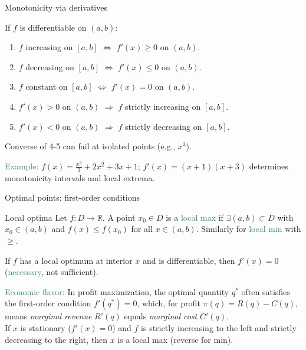 \documentclass[11pt,aspectratio=169]{beamer}
\begin{document}
\begin{frame}{Monotonicity via derivatives}

If $f$ is differentiable on $(a,b)$:
\begin{enumerate}
\item $f$ increasing on $[a,b]$ $\Longleftrightarrow$ $f'(x)\ge 0$ on $(a,b)$.
\item $f$ decreasing on $[a,b]$ $\Longleftrightarrow$ $f'(x)\le 0$ on $(a,b)$.
\item $f$ constant on $[a,b]$ $\Longleftrightarrow$ $f'(x)=0$ on $(a,b)$.
\item $f'(x)>0$ on $(a,b)$ $\Rightarrow$ $f$ strictly increasing on $[a,b]$.
\item $f'(x)<0$ on $(a,b)$ $\Rightarrow$ $f$ strictly decreasing on $[a,b]$.
\end{enumerate}
\begin{tiny}Converse of 4-5 can fail at isolated points (e.g., $x^3$).\end{tiny}
\bigskip

\textcolor{SeaGreen}{Example:} $f(x)=\frac{x^3}{3}+2x^2+3x+1$; $f'(x)=(x+1)(x+3)$ determines monotonicity intervals and local extrema.
\end{frame}

\begin{frame}{Optimal points: first-order conditions}
\begin{block}{Local optima}
Let $f:D\to\mathbb{R}$. A point $x_0\in D$ is a \textcolor{SeaGreen}{local max} if $\exists (a,b)\subset D$ with $x_0\in(a,b)$ and $f(x)\le f(x_0)$ for all $x\in(a,b)$.
Similarly for \textcolor{SeaGreen}{local min} with $\ge$.\\[4mm]
	
\end{block}

\smallskip

If $f$ has a local optimum at interior $x$ and is differentiable, then $f'(x)=0$ (\textcolor{SeaGreen}{necessary}, not sufficient).\\[4mm]
\smallskip

\textcolor{SeaGreen}{Economic flavor:} 
In profit maximization, the optimal quantity $q^*$ often satisfies the first-order condition $f'(q^*)=0$,  
which, for profit $\pi(q) = R(q) - C(q)$, means \emph{marginal revenue} $R'(q)$ equals \emph{marginal cost} $C'(q)$.\\[4mm]

If $x$ is stationary ($f'(x)=0$) and $f$ is strictly increasing to the left and strictly decreasing to the right, then $x$ is a local max (reverse for min).

\end{frame}
\end{document}
